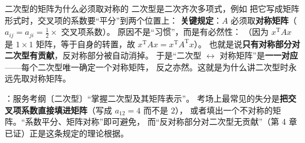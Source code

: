 \begin{fdeep}{二次型的矩阵为什么必须取对称的}
二次型是二次齐次多项式，例如
把它写成矩阵形式时，交叉项的系数要“平分”到两个位置上：
\textbf{关键规定}：$A$ 必须取\textbf{对称矩阵}（$a_{ij}=a_{ji}=\frac12\times$ 交叉项系数）。
原因不是“习惯”，而是有必然性：
（因为 $x^{\mathrm T}Ax$ 是 $1\times1$ 矩阵，等于自身的转置，故 $x^{\mathrm T}Ax=x^{\mathrm T}A^{\mathrm T}x$）。
也就是说\textbf{只有对称部分对二次型有贡献}，反对称部分被自动消掉。
于是“二次型 $\leftrightarrow$ 对称矩阵”是\textbf{一一对应}——每个二次型唯一确定一个对称矩阵，
反之亦然。这就是为什么讲二次型时永远先取对称矩阵。

\fbref{}：服务考纲〔二次型〕“掌握二次型及其矩阵表示”。
考场上最常见的失分是\textbf{把交叉项系数直接填进矩阵}（写成 $a_{12}=4$ 而不是 $2$），
或者填出一个不对称的矩阵。“系数平分、矩阵对称”即可避免，
而“反对称部分对二次型无贡献”（第 4 章已证）正是这条规定的理论根据。
\end{fdeep}

